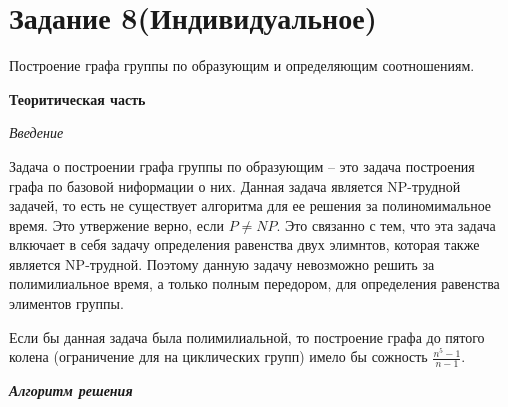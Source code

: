\section*{Задание 8(Индивидуальное)}

Построение графа группы по образующим и определяющим соотношениям.

\begin{center}
  \large
  \vspace{\baselineskip}
  \bfseries Теоритическая часть

  \textit{Введение}
\end{center}

Задача о построении графа группы по образующим -- это задача построения графа по базовой ниформации о них. Данная задача является NP-трудной задачей, то есть не существует алгоритма для ее решения за полиномимальное время. Это утвержение верно, если $P \neq NP$. Это связанно с тем, что эта задача влкючает в себя задачу определения равенства двух элимнтов, которая также является NP-трудной. Поэтому данную задачу невозможно решить за полимилиальное время, а только полным передором, для определения равенства элиментов группы.

Если бы данная задача была полимилиальной, то построение графа до пятого колена (ограничение для на циклических групп) имело бы сожность $ \frac{n^5-1}{n-1}$.

\vspace{\baselineskip}


\begin{center}
  \textbf{\textit{Алгоритм решения}}
\end{center}

